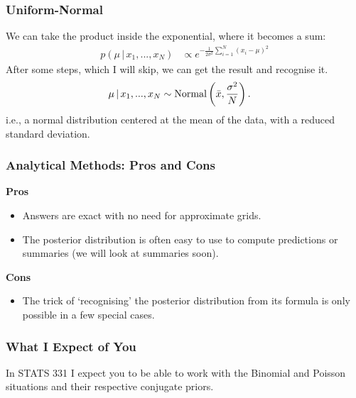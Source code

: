 \documentclass{beamer}
\newcommand{\given}{\,|\,}
\begin{document}
\begin{frame}
\frametitle{Uniform-Normal}
We can take the product inside the exponential, where it becomes a sum:
\begin{align}
p(\mu \given x_1, ..., x_N) &\propto
    e^{-\frac{1}{2\sigma^2}\sum_{i=1}^N(x_i - \mu)^2}
\end{align}
\pause
After some steps, which I will skip, we can get the result and recognise it.
\begin{align}
\mu \given x_1, ..., x_N &\sim \textnormal{Normal}\left(\bar{x}, \frac{\sigma^2}{N}\right).
\end{align}
\pause
i.e., a normal distribution centered at the mean of the data, with a reduced
standard deviation.



\end{frame}



\begin{frame}
\frametitle{Analytical Methods: Pros and Cons}

{\bf Pros}
\begin{itemize}
\item Answers are exact with no need for approximate grids.\pause
\item The posterior distribution is often easy to use to compute
    predictions or summaries (we will look at summaries soon).
\end{itemize}
\pause
{\bf Cons}
\begin{itemize}
\item The trick of `recognising' the posterior distribution from its formula
is only possible in a few special cases.
\end{itemize}


\end{frame}



\begin{frame}
\frametitle{What I Expect of You}
In STATS 331 I expect you to be able to work with the Binomial and
Poisson situations and their respective conjugate priors.

\end{frame}
\end{document}
